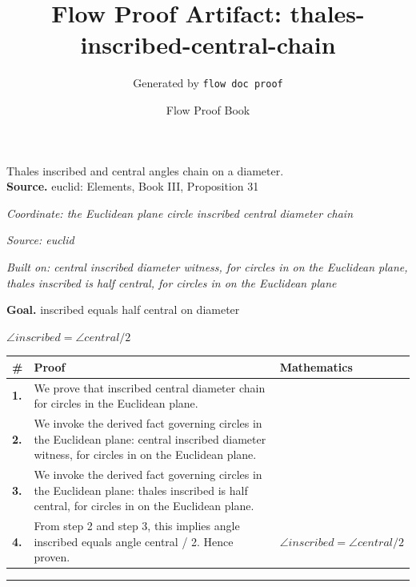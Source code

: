 \documentclass[11pt]{article}
\title{Flow Proof Artifact: thales-inscribed-central-chain}
\author{Generated by \texttt{flow doc proof}}
\date{Flow Proof Book}
\theoremstyle{definition}
\begin{document}
\maketitle
Thales inscribed and central angles chain on a diameter.\\[0.5em]
\textbf{Source.} euclid: Elements, Book III, Proposition 31\\[0.5em]
\bigskip
{}\par
\smallskip\noindent\textit{Coordinate: the Euclidean plane \cdot circle \cdot inscribed central diameter chain}\par
\smallskip\noindent\textit{Source: euclid}\par
\smallskip\noindent\textit{Built on: central inscribed diameter witness, for circles in on the Euclidean plane, thales inscribed is half central, for circles in on the Euclidean plane}\par
\medskip
\noindent\textbf{Goal.} inscribed equals half central on diameter\par
\noindent$\displaystyle \angle inscribed = \angle central / 2$\par
\medskip
\noindent
\begin{tabular}{@{} >{\raggedright\arraybackslash}p{} >{\raggedright\arraybackslash}p{} >{\raggedleft\arraybackslash}p{} @{}}
\textbf{\#} & \textbf{Proof} & \textbf{Mathematics} \\
\midrule
\textbf{1.} & We prove that inscribed central diameter chain for circles in the Euclidean plane. & \\[0.45em]
\textbf{2.} & We invoke the derived fact governing circles in the Euclidean plane: central inscribed diameter witness, for circles in on the Euclidean plane. & \\[0.45em]
\textbf{3.} & We invoke the derived fact governing circles in the Euclidean plane: thales inscribed is half central, for circles in on the Euclidean plane. & \\[0.45em]
\textbf{4.} & From step 2 and step 3, this implies angle inscribed equals angle central / 2. Hence proven. & $\displaystyle \angle inscribed = \angle central / 2$ \\[0.45em]
\bottomrule
\end{tabular}
\label{thm:Geometry-circle-inscribed_central_diameter_chain}
\par\medskip\hrule
\end{document}
